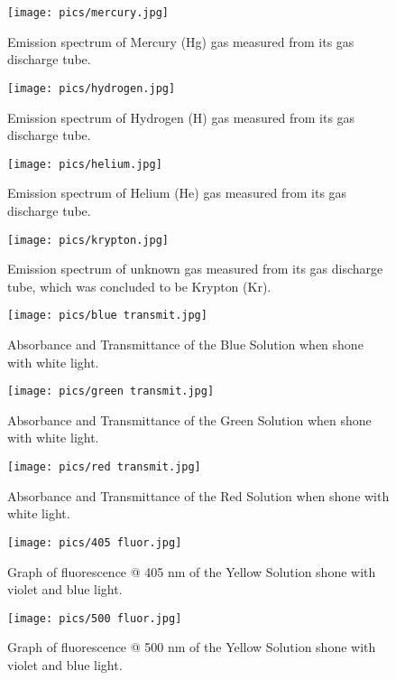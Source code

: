 \documentclass[10pt, letterpaper, twoside]{article}
\begin{document}
\begin{figure}[!ht]
    \centering
    \texttt{[image: pics/mercury.jpg]}
    \caption{Emission spectrum of Mercury (Hg) gas measured from its gas discharge tube.}
    \label{fig:my_label}
\end{figure}

\begin{figure}[!ht]
    \centering
    \texttt{[image: pics/hydrogen.jpg]}
    \caption{Emission spectrum of Hydrogen (H) gas measured from its gas discharge tube.}
    \label{fig:my_label}
\end{figure}

\begin{figure}[!ht]
    \centering
    \texttt{[image: pics/helium.jpg]}
    \caption{Emission spectrum of Helium (He) gas measured from its gas discharge tube.}
    \label{fig:my_label}
\end{figure}

\begin{figure}[!ht]
    \centering
    \texttt{[image: pics/krypton.jpg]}
    \caption{Emission spectrum of unknown gas measured from its gas discharge tube, which was concluded to be Krypton (Kr).}
    \label{fig:my_label}
\end{figure}

\begin{figure}[!ht]
    \centering
    \texttt{[image: pics/blue transmit.jpg]}
    \caption{Absorbance and Transmittance of the Blue Solution when shone with white light.}
    \label{fig:my_label}
\end{figure}

\begin{figure}[!ht]
    \centering
    \texttt{[image: pics/green transmit.jpg]}
    \caption{Absorbance and Transmittance of the Green Solution when shone with white light.}
    \label{fig:my_label}
\end{figure}

\begin{figure}[!ht]
    \centering
    \texttt{[image: pics/red transmit.jpg]}
    \caption{Absorbance and Transmittance of the Red Solution when shone with white light.}
    \label{fig:my_label}
\end{figure}

\begin{figure}[!ht]
    \centering
    \texttt{[image: pics/405 fluor.jpg]}
    \caption{Graph of fluorescence @ 405 nm of the Yellow Solution shone with violet and blue light.}
    \label{fig:my_label}
\end{figure}

\begin{figure}[!ht]
    \centering
    \texttt{[image: pics/500 fluor.jpg]}
    \caption{Graph of fluorescence @ 500 nm of the Yellow Solution shone with violet and blue light.}
    \label{fig:my_label}
\end{figure}
\end{document}
